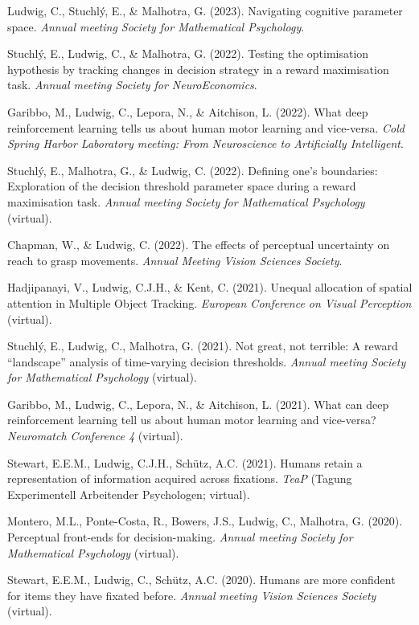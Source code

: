 \documentclass[a4paper, 10pt]{article}
\renewenvironment{itemize}{
  \begin{list}{}{
    \setlength{\leftmargin}{1.5em}
  }
}{
  \end{list}
}
\begin{document}
\begin{itemize}
\item Ludwig, C., Stuchl\'y, E., \& Malhotra, G. (2023). Navigating cognitive parameter space. \textit{Annual meeting Society for Mathematical Psychology}. 
\item Stuchl\'y, E., Ludwig, C., \& Malhotra, G. (2022). Testing the optimisation hypothesis by tracking changes in decision strategy in a reward maximisation task. \textit{Annual meeting Society for NeuroEconomics}. 
\item Garibbo, M., Ludwig, C., Lepora, N., \& Aitchison, L. (2022). What deep reinforcement learning tells us about human motor learning and vice-versa. \textit{Cold Spring Harbor Laboratory meeting: From Neuroscience to Artificially Intelligent}.
\item Stuchl\'y, E., Malhotra, G., \& Ludwig, C. (2022). Defining one’s boundaries: Exploration of the decision threshold parameter space during a reward maximisation task. \textit{Annual meeting Society for Mathematical Psychology} (virtual).
\item Chapman, W., \& Ludwig, C. (2022). The effects of perceptual uncertainty on reach to grasp movements. \textit{Annual Meeting Vision Sciences Society}.
\item Hadjipanayi, V., Ludwig, C.J.H., \& Kent, C. (2021). Unequal allocation of spatial attention in Multiple Object Tracking. \textit{European Conference on Visual Perception} (virtual).
\item Stuchl\'y, E., Ludwig, C., Malhotra, G. (2021). Not great, not terrible: A reward ``landscape'' analysis of time-varying decision thresholds. \textit{Annual meeting Society for Mathematical Psychology} (virtual).
\item Garibbo, M., Ludwig, C., Lepora, N., \& Aitchison, L. (2021). What can deep reinforcement learning tell us about human motor learning and vice-versa? \textit{Neuromatch Conference 4} (virtual).
\item Stewart, E.E.M., Ludwig, C.J.H., Sch{\"u}tz, A.C. (2021). Humans retain a representation of information acquired across fixations. \textit{TeaP} (Tagung Experimentell Arbeitender Psychologen; virtual).
\item Montero, M.L., Ponte-Costa, R., Bowers, J.S., Ludwig, C., Malhotra, G. (2020). Perceptual front-ends for decision-making. \textit{Annual meeting Society for Mathematical Psychology} (virtual).
\item Stewart, E.E.M., Ludwig, C., Sch{\"u}tz, A.C. (2020). Humans are more confident for items they have fixated before. \textit{Annual meeting Vision Sciences Society} (virtual).

\end{itemize}
\end{document}
